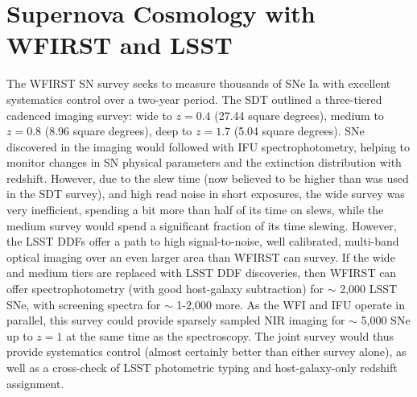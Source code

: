%
%

\section{Supernova Cosmology with WFIRST and LSST}
\def\secname{\chpname:supernovae}\label{sec:\secname}


%

The WFIRST SN survey seeks to measure thousands of SNe Ia with excellent systematics control over a two-year period. The SDT outlined a three-tiered cadenced imaging survey: wide to $z=0.4$ (27.44 square degrees), medium to $z=0.8$ (8.96 square degrees), deep to $z=1.7$ (5.04 square degrees). SNe discovered in the imaging would followed with IFU spectrophotometry, helping to monitor changes in SN physical parameters and the extinction distribution with redshift. However, due to the slew time (now believed to be higher than was used in the SDT survey), and high read noise in short exposures, the wide survey was very inefficient, spending a bit more than half of its time on slews, while the medium survey would spend a significant fraction of its time slewing. However, the LSST DDFs offer a path to high signal-to-noise, well calibrated, multi-band optical imaging over an even larger area than WFIRST can survey. If the wide and medium tiers are replaced with LSST DDF discoveries, then WFIRST can offer spectrophotometry (with good host-galaxy subtraction) for $\sim$ 2,000 LSST SNe, with screening spectra for $\sim$ 1-2,000 more. As the WFI and IFU operate in parallel, this survey could provide sparsely sampled NIR imaging for $\sim$ 5,000 SNe up to $z = 1$ at the same time as the spectroscopy. The joint survey would thus provide systematics control (almost certainly better than either survey alone), as well as a cross-check of LSST photometric typing and host-galaxy-only redshift assignment.

